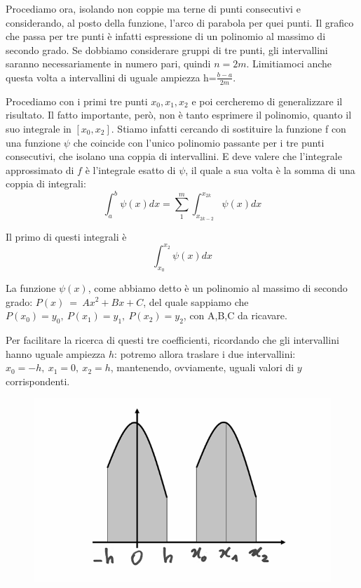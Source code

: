 \documentclass{article}
\begin{document}
Procediamo ora, isolando non coppie ma terne di punti consecutivi e considerando, al posto della funzione, l’arco di parabola per quei punti. Il grafico che passa per tre punti è infatti espressione di un polinomio al massimo di secondo grado. Se dobbiamo considerare gruppi di tre punti, gli intervallini saranno necessariamente in numero pari, quindi $n=2m$. Limitiamoci anche questa volta a intervallini di uguale ampiezza h=$\frac{b-a}{2m}$.

Procediamo con i primi tre punti $x_0,x_1,x_2$ e poi cercheremo di generalizzare il risultato. Il fatto importante, però, non è tanto esprimere il polinomio, quanto il suo integrale in $[x_0,x_2]$. Stiamo infatti cercando di sostituire la funzione f con una funzione $\psi$ che coincide con l’unico polinomio passante per i tre punti consecutivi, che isolano una coppia di intervallini. E deve valere che l’integrale approssimato di $f$ è l’integrale esatto di $\psi$, il quale a sua volta è la somma di una coppia di integrali:
\[
\int_a^b\psi(x)dx=\sum_1^m\int_{x_{2k-2}}^{x_{2k}}\psi(x)dx\]

Il primo di questi integrali è
\[
\int_{x_0}^{x_2}\psi(x)dx\]

La funzione $\psi(x)$, come abbiamo detto è un polinomio al massimo di secondo grado: $P(x)~=~Ax^2+Bx+C$, del quale sappiamo che $P(x_0)=y_0,\ P(x_1)=y_1,\ P(x_2)=y_2$, con A,B,C da ricavare.

Per facilitare la ricerca di questi tre coefficienti, ricordando che gli intervallini hanno uguale ampiezza $h$: potremo allora traslare i due intervallini: $x_0=-h,\ x_1=0,\ x_2=h$, mantenendo, ovviamente, uguali valori di $y$ corrispondenti.

\begin{figure}[ht]
\centering
\includegraphics[scale=0.25]{img/09_04_simmetria.png} 
\label{fig:trasl}
\end{figure}
\end{document}
